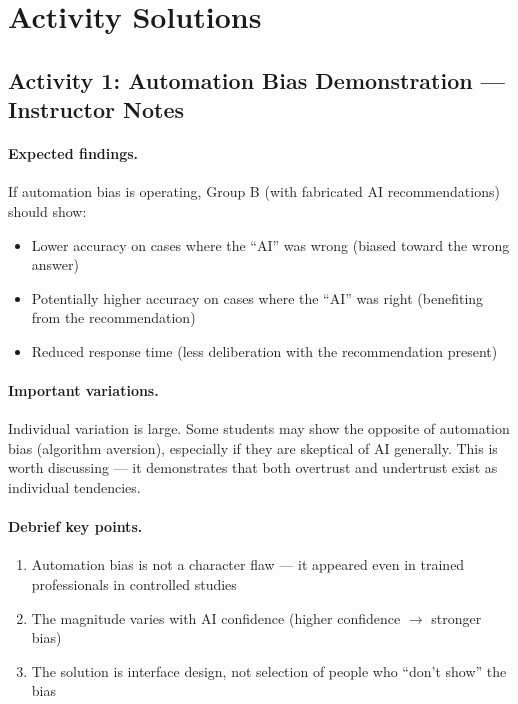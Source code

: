 \section{Activity Solutions}

\subsection{Activity 1: Automation Bias Demonstration --- Instructor Notes}

\paragraph{Expected findings.}

If automation bias is operating, Group B (with fabricated AI recommendations) should show:
\begin{itemize}
    \item Lower accuracy on cases where the ``AI'' was wrong (biased toward the wrong answer)
    \item Potentially higher accuracy on cases where the ``AI'' was right (benefiting from the recommendation)
    \item Reduced response time (less deliberation with the recommendation present)
\end{itemize}

\paragraph{Important variations.}

Individual variation is large. Some students may show the opposite of automation bias (algorithm aversion), especially if they are skeptical of AI generally. This is worth discussing --- it demonstrates that both overtrust and undertrust exist as individual tendencies.

\paragraph{Debrief key points.}

\begin{enumerate}
    \item Automation bias is not a character flaw --- it appeared even in trained professionals in controlled studies
    \item The magnitude varies with AI confidence (higher confidence $\to$ stronger bias)
    \item The solution is interface design, not selection of people who ``don't show'' the bias
\end{enumerate}

